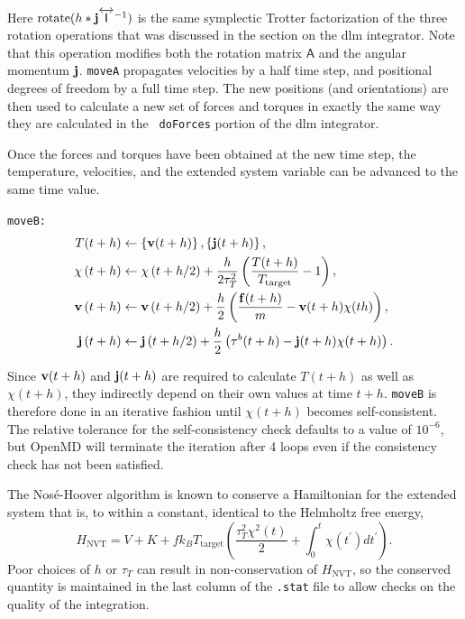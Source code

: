 \documentclass[]{book}
\begin{document}
Here $\mathrm{rotate}(h * {\bf j}
\overleftrightarrow{\mathsf{I}}^{-1})$ is the same symplectic Trotter
factorization of the three rotation operations that was discussed in
the section on the {\sc dlm} integrator.  Note that this operation modifies
both the rotation matrix $\mathsf{A}$ and the angular momentum ${\bf
j}$.  {\tt moveA} propagates velocities by a half time step, and
positional degrees of freedom by a full time step.  The new positions
(and orientations) are then used to calculate a new set of forces and
torques in exactly the same way they are calculated in the {\tt
doForces} portion of the {\sc dlm} integrator.

Once the forces and torques have been obtained at the new time step,
the temperature, velocities, and the extended system variable can be
advanced to the same time value.

{\tt moveB:}
\begin{align*}
T(t + h) &\leftarrow \left\{{\bf v}(t + h)\right\}, 
	\left\{{\bf j}(t + h)\right\}, \\
%
\chi\left(t + h \right) &\leftarrow \chi\left(t + h /
	2 \right) + \frac{h}{2 \tau_T^2} \left( \frac{T(t+h)}
	{T_{\mathrm{target}}} - 1 \right), \\
%
{\bf v}\left(t + h \right)  &\leftarrow {\bf v}\left(t 
	+ h / 2 \right) + \frac{h}{2} \left(
	\frac{{\bf f}(t + h)}{m} - {\bf v}(t + h)
	\chi(t h)\right) ,\\
%
{\bf j}\left(t + h \right) &\leftarrow {\bf j}\left(t
	+ h / 2 \right) + \frac{h}{2} 
	\left( {\bf \tau}^b(t + h) - {\bf j}(t + h) 
	\chi(t + h) \right) .
\end{align*}

Since ${\bf v}(t + h)$ and ${\bf j}(t + h)$ are required to calculate
$T(t + h)$ as well as $\chi(t + h)$, they indirectly depend on their
own values at time $t + h$.  {\tt moveB} is therefore done in an
iterative fashion until $\chi(t + h)$ becomes self-consistent.  The
relative tolerance for the self-consistency check defaults to a value
of $\mbox{10}^{-6}$, but {\sc OpenMD} will terminate the iteration
after 4 loops even if the consistency check has not been satisfied.

The Nos\'e-Hoover algorithm is known to conserve a Hamiltonian for the
extended system that is, to within a constant, identical to the
Helmholtz free energy,\cite{melchionna93}
\begin{equation}
H_{\mathrm{NVT}} = V + K + f k_B T_{\mathrm{target}} \left(
\frac{\tau_{T}^2 \chi^2(t)}{2} + \int_{0}^{t} \chi(t^\prime) dt^\prime
\right).
\end{equation}
Poor choices of $h$ or $\tau_T$ can result in non-conservation
of $H_{\mathrm{NVT}}$, so the conserved quantity is maintained in the
last column of the {\tt .stat} file to allow checks on the quality of
the integration.
\end{document}
